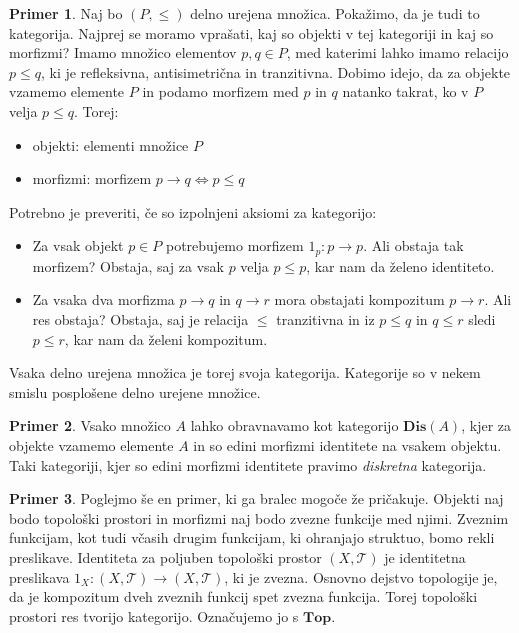 \documentclass[12pt,a4paper]{book}
\theoremstyle{definition}
\theoremstyle{plain}
\theoremstyle{definition}
\newtheorem{primer}{Primer}[section]
\theoremstyle{remark}
\newcommand{\cat}[1]{\textbf{#1}}
\begin{document}
\begin{primer}
Naj bo $(P, \leq)$ delno urejena množica. Pokažimo, da je tudi to kategorija. Najprej se moramo vprašati, kaj so objekti v tej kategoriji in kaj so morfizmi?
Imamo množico elementov $p,q \in P$, med katerimi lahko imamo relacijo $p \leq q$, ki je refleksivna, antisimetrična in tranzitivna. Dobimo idejo, da za objekte vzamemo elemente $P$ in podamo morfizem med $p$ in $q$ natanko takrat, ko v $P$ velja $p \leq q$.
Torej: 
\begin{itemize}
\item objekti: elementi množice $P$
\item morfizmi: morfizem $p \rightarrow q \Leftrightarrow p \leq q$
\end{itemize}
Potrebno je preveriti, če so izpolnjeni aksiomi za kategorijo:

\begin{itemize}
\item Za vsak objekt $p \in P$ potrebujemo morfizem $1_p : p \to p$. Ali obstaja tak morfizem? Obstaja, saj za vsak $p$ velja $p \leq p$, kar nam da želeno identiteto.
\item Za vsaka dva morfizma $p \to q$ in $q \to r$ mora obstajati kompozitum $p \to r$. Ali res obstaja? Obstaja, saj je relacija $\leq$ tranzitivna in iz $p \leq q$ in $q \leq r$ sledi $p \leq r$, kar nam da želeni kompozitum.
\end{itemize}
Vsaka delno urejena množica je torej svoja kategorija. Kategorije so v nekem smislu posplošene delno urejene množice.
\end{primer}



\begin{primer}
Vsako množico $A$ lahko obravnavamo kot kategorijo $\cat{Dis}(A)$, kjer za objekte vzamemo elemente $A$ in so edini morfizmi identitete na vsakem objektu. Taki kategoriji, kjer so edini morfizmi identitete pravimo \emph{diskretna} kategorija.
\end{primer}

\begin{primer}
Poglejmo še en primer, ki ga bralec mogoče že pričakuje. Objekti naj bodo topološki prostori in morfizmi naj bodo zvezne funkcije med njimi. Zveznim funkcijam, kot tudi včasih drugim funkcijam, ki ohranjajo struktuo, bomo rekli preslikave. Identiteta za poljuben topološki prostor $(X, \mathcal{T})$ je identitetna preslikava $1_X : (X, \mathcal{T}) \to (X, \mathcal{T})$, ki je zvezna. Osnovno dejstvo topologije je, da je kompozitum dveh zveznih funkcij spet zvezna funkcija. Torej topološki prostori res tvorijo kategorijo. Označujemo jo s $\cat{Top}$.
\end{primer}
\end{document}
